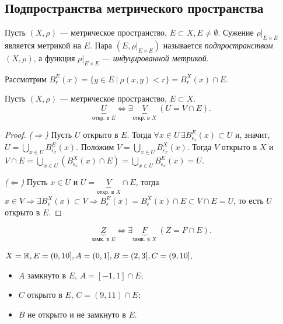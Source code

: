 
\subsection{Подпространства метрического пространства}

\begin{definition}
Пусть $(X, \rho)$ --- метрическое пространство, $E \subset X, E \neq \emptyset$. Сужение $\rho\vert_{E \times E}$ является метрикой на $E$. Пара $(E, \rho\vert_{E \times E})$ называется \emph{подпространством} $(X, \rho)$, а функция $\rho\vert_{E \times E}$ --- \emph{индуцированной метрикой}.
\end{definition}

Рассмотрим $B_r^E (x) = \{y \in E \ | \ \rho(x, y) < r\} = B^X_r(x) \cap E$.

\begin{lemma}
    Пусть $(X, \rho)$ --- метрическое пространство, $E \subset X$.
    \[
        \underbrace{U}_{\text{откр. в $E$}} \Leftrightarrow \exists \underbrace{V}_{\text{откр. в $X$}} \ (U = V \cap E).
    \]


    \begin{proof}
        \emph{($\Rightarrow$)} Пусть $U$ открыто в $E$. Тогда $\forall x \in U \, \exists B_{\epsilon_x}^E(x) \subset U$ и, значит, $U = \bigcup_{x \in U} B_{\epsilon_x}^E (x)$. Положим $V = \bigcup_{x \in U} B_{\epsilon_x}^X (x)$. Тогда $V$ открыто в $X$ и $V \cap E = \bigcup_{x \in U} (B_{\epsilon_x}^X(x) \cap E) = \bigcup_{x \in U} B_{\epsilon_x}^E(x) = U$.

        \emph{($\Leftarrow$)} Пусть $x \in U$ и $U = \underbrace{V}_{\text{откр. в $X$}} \cap E$, тогда $x \in V \Rightarrow \exists B_\epsilon^X(x) \subset V \Rightarrow B_\epsilon^E(x) = B_\epsilon^X(x) \cap E \subset V \cap E = U$, то есть $U$ открыто в $E$.
    \end{proof}
\end{lemma}

\begin{corollary}
    \[
        \underbrace{Z}_{\text{замк. в $E$}} \Leftrightarrow \exists \underbrace{F}_{\text{замк. в $X$}} \ (Z = F \cap E).
    \]
\end{corollary}

\begin{example}
    $X = \mathbb{R}, E = (0, 10], A = (0, 1], B = (2, 3], C = (9, 10]$.

    \begin{itemize}
        \item $A$ замкнуто в $E$, $A = [-1, 1] \cap E$;
        \item $C$ открыто в $E$, $C = (9, 11) \cap E$;
        \item $B$ не открыто и не замкнуто в $E$.
    \end{itemize}
\end{example}

